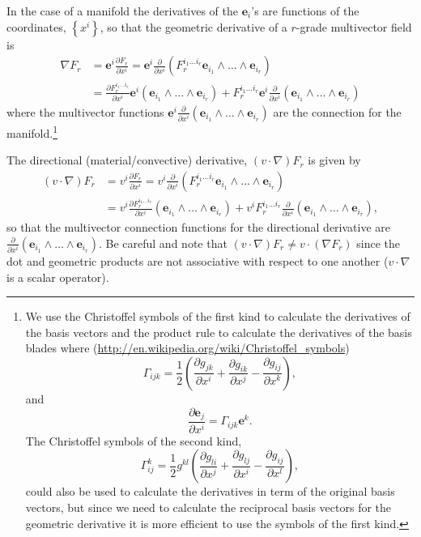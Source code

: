 \documentclass[12pt]{report}
\newcommand{\bm}[1]{\boldsymbol{#1}}
\newcommand{\bfrac}[2]{\displaystyle\frac{#1}{#2}}
\newcommand{\lp}{\left (}
\newcommand{\rp}{\right )}
\newcommand{\half}{\frac{1}{2}}
\newcommand{\pdiff}[2]{\bfrac{\partial {#1}}{\partial {#2}}}
\newcommand{\lbrc}{\left \{}
\newcommand{\rbrc}{\right \}}
\newcommand{\set}[1]{\lbrc {#1} \rbrc}
\newcommand{\W}{\wedge}
\newcommand{\paren}[1]{\lp {#1} \rp}
\newcommand{\eb}{\bm{e}}
\begin{document}
In the case of a manifold the derivatives of the $\bm{e}_{i}$'s are functions of the coordinates,
$\set{x^{i}}$, so that the geometric derivative of a $r$-grade multivector field is
\begin{align}
    \nabla F_{r} &= \bm{e}^{i}\pdiff{F_{r}}{x^{i}} = \bm{e}^{i}\pdiff{}{x^{i}}
                   \paren{F_{r}^{i_{1}\dots i_{r}}\bm{e}_{i_{1}}\W\dots\W\bm{e}_{i_{r}}} \nonumber \\
                 &= \pdiff{F_{r}^{i_{1}\dots i_{r}}}{x^{i}}\bm{e}^{i}\paren{\bm{e}_{i_{1}}\W\dots\W\bm{e}_{i_{r}}}
                    +F_{r}^{i_{1}\dots i_{r}}\bm{e}^{i}\pdiff{}{x^{i}}\paren{\bm{e}_{i_{1}}\W\dots\W\bm{e}_{i_{r}}}
\end{align}
where the multivector functions $\bm{e}^{i}\pdiff{}{x^{i}}\paren{\bm{e}_{i_{1}}\W\dots\W\bm{e}_{i_{r}}}$ are the
connection for the manifold.\footnote{We use the Christoffel symbols of the first kind
to calculate the derivatives of the basis vectors and the product rule to
calculate the derivatives of the basis blades where (\url{http://en.wikipedia.org/wiki/Christoffel_symbols})
\begin{equation*}
\Gamma_{ijk} = \half \paren{\pdiff{g_{jk}}{x^{i}}+\pdiff{g_{ik}}{x^{j}}-\pdiff{g_{ij}}{x^{k}}},
\end{equation*}
and
\begin{equation*}
\pdiff{\eb_{j}}{x^{i}} = \Gamma_{ijk}\eb^{k}.
\end{equation*}
The Christoffel symbols of the second kind,
\begin{equation*}
\Gamma_{ij}^{k} = \half g^{kl}\paren{\pdiff{g_{li}}{x^{j}}+\pdiff{g_{lj}}{x^{i}}-\pdiff{g_{ij}}{x^{l}}},
\end{equation*}
could also be used to calculate the derivatives in term of the original basis vectors, but since we need to calculate the
reciprocal basis vectors for the geometric derivative
it is more efficient to use the symbols of the first kind.}

The directional (material/convective) derivative, $\paren{v\cdot\nabla}F_{r}$ is given by
\begin{align}
    \paren{v\cdot\nabla} F_{r} &= v^{i}\pdiff{F_{r}}{x^{i}} = v^{i}\pdiff{}{x^{i}}
                   \paren{F_{r}^{i_{1}\dots i_{r}}\bm{e}_{i_{1}}\W\dots\W\bm{e}_{i_{r}}} \nonumber \\
                 &= v^{i}\pdiff{F_{r}^{i_{1}\dots i_{r}}}{x^{i}}\paren{\bm{e}_{i_{1}}\W\dots\W\bm{e}_{i_{r}}}
                    +v^{i}F_{r}^{i_{1}\dots i_{r}}\pdiff{}{x^{i}}\paren{\bm{e}_{i_{1}}\W\dots\W\bm{e}_{i_{r}}},
\end{align}
so that the multivector connection functions for the directional derivative are
$\pdiff{}{x^{i}}\paren{\bm{e}_{i_{1}}\W\dots\W\bm{e}_{i_{r}}}$. Be careful and note that
$\paren{v\cdot\nabla} F_{r} \ne v\cdot \paren{\nabla F_{r}}$ since the dot and geometric products are
not associative with respect to one another ($v\cdot\nabla$ is a scalar operator).
\end{document}
